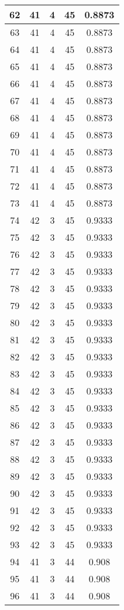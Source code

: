 \documentclass[letterpaper, 12pt]{article}
\begin{document}
\begin{longtable}{|c|c|c|c|c|}
\hline
62 & 41 & 4 & 45 & 0.8873 \\
\hline
63 & 41 & 4 & 45 & 0.8873 \\
\hline
64 & 41 & 4 & 45 & 0.8873 \\
\hline
65 & 41 & 4 & 45 & 0.8873 \\
\hline
66 & 41 & 4 & 45 & 0.8873 \\
\hline
67 & 41 & 4 & 45 & 0.8873 \\
\hline
68 & 41 & 4 & 45 & 0.8873 \\
\hline
69 & 41 & 4 & 45 & 0.8873 \\
\hline
70 & 41 & 4 & 45 & 0.8873 \\
\hline
71 & 41 & 4 & 45 & 0.8873 \\
\hline
72 & 41 & 4 & 45 & 0.8873 \\
\hline
73 & 41 & 4 & 45 & 0.8873 \\
\hline
74 & 42 & 3 & 45 & 0.9333 \\
\hline
75 & 42 & 3 & 45 & 0.9333 \\
\hline
76 & 42 & 3 & 45 & 0.9333 \\
\hline
77 & 42 & 3 & 45 & 0.9333 \\
\hline
78 & 42 & 3 & 45 & 0.9333 \\
\hline
79 & 42 & 3 & 45 & 0.9333 \\
\hline
80 & 42 & 3 & 45 & 0.9333 \\
\hline
81 & 42 & 3 & 45 & 0.9333 \\
\hline
82 & 42 & 3 & 45 & 0.9333 \\
\hline
83 & 42 & 3 & 45 & 0.9333 \\
\hline
84 & 42 & 3 & 45 & 0.9333 \\
\hline
85 & 42 & 3 & 45 & 0.9333 \\
\hline
86 & 42 & 3 & 45 & 0.9333 \\
\hline
87 & 42 & 3 & 45 & 0.9333 \\
\hline
88 & 42 & 3 & 45 & 0.9333 \\
\hline
89 & 42 & 3 & 45 & 0.9333 \\
\hline
90 & 42 & 3 & 45 & 0.9333 \\
\hline
91 & 42 & 3 & 45 & 0.9333 \\
\hline
92 & 42 & 3 & 45 & 0.9333 \\
\hline
93 & 42 & 3 & 45 & 0.9333 \\
\hline
94 & 41 & 3 & 44 & 0.908 \\
\hline
95 & 41 & 3 & 44 & 0.908 \\
\hline
96 & 41 & 3 & 44 & 0.908 \\

\end{longtable}
\end{document}
